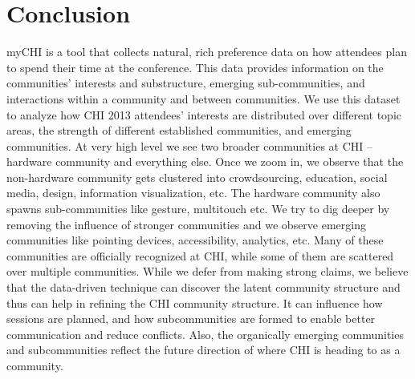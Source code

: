 \documentclass{sigchi}
\begin{document}
\section{Conclusion}

myCHI is a tool that collects natural, rich preference data on how attendees plan to spend their time at the conference. This data provides information on the communities' interests and substructure, emerging sub-communities, and interactions within a community and between communities. We use this dataset to analyze how CHI 2013 attendees' interests are distributed over different topic areas, the strength of different established communities, and emerging communities. At very high level we see two broader communities at CHI -- hardware community and everything else. Once we zoom in, we observe that the non-hardware community gets clustered into crowdsourcing, education, social media, design, information visualization, etc. The hardware community also spawns sub-communities like gesture, multitouch etc. We try to dig deeper by removing the influence of stronger communities and we observe emerging communities like pointing devices, accessibility, analytics, etc.  Many of these communities are officially recognized at CHI, while some of them are scattered over multiple communities. While we defer from making strong claims, we believe that the data-driven technique can discover the latent community structure and thus can help in refining the CHI community structure. It can influence how sessions are planned, and how subcommunities are formed to enable better communication and reduce conflicts. Also, the organically emerging communities and subcommunities reflect the future direction of where CHI is heading to as a community.



%
%
%
%
%
\balance



\end{document}
